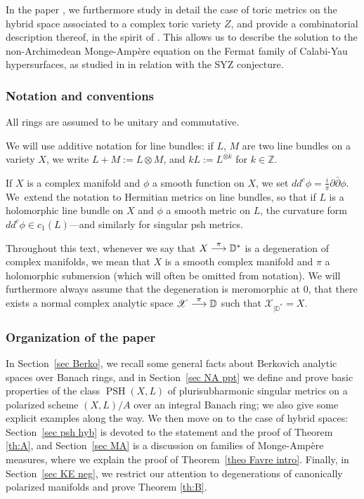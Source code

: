 \documentclass[JEP,XML,SOM,Unicode,published]{cedram}
\newcommand{\To}[1]{\mathchoice{\xrightarrow{\textstyle\kern4pt#1\kern3pt}}{\stackrel{#1}{\longrightarrow}}{}{}}
\theoremstyle{definition}
\newcommand \D {\mathbb{D}}
\newcommand \Z{\mathbb Z}
\newcommand \X {\mathscr{X}}
\DeclareMathOperator{\PSH}{PSH}
\newcommand{\ddbar}{\partial\bar{\partial}}
\begin{document}
In the paper \cite{PS22}, we furthermore study in detail the case of toric metrics on the hybrid space associated to a complex toric variety $Z$, and provide a combinatorial description thereof, in the spirit of \cite{BPS}. This allows us to describe the solution to the non-Archimedean Monge-Ampère equation on the Fermat family of Calabi-Yau hypersurfaces, as studied in \cite{Li1} in relation with the SYZ conjecture.

\subsubsection*{Notation and conventions}
All rings are assumed to be unitary and commutative.

We will use additive notation for line bundles: if $L$, $M$ are two line bundles on a variety $X$, we write $L+M:= L\otimes M$, and $kL:= L^{\otimes k}$ for $k \in \Z$.

If $X$ is a complex manifold and $\phi$ a smooth function on $X$, we set $dd^c \phi = \frac{i}{\pi} \ddbar \phi$. We~extend the notation to Hermitian metrics on line bundles, so that if $L$ is a holomorphic line bundle on $X$ and $\phi$ a smooth metric on $L$, the curvature form $dd^c \phi \in c_1(L)$---and similarly for singular psh metrics.

Throughout this text, whenever we say that $X \To{\pi} \D^*$ is a degeneration of complex manifolds, we mean that $X$ is a smooth complex manifold and $\pi$ a holomorphic submersion (which will often be omitted from notation). We will furthermore always assume that the degeneration is meromorphic at $0$, \ie that there exists a normal complex analytic space $\X \To{\pi} \D$ such that $\X_{| \D^*} = X$.

\subsubsection*{Organization of the paper} In Section~\ref{sec Berko}, we recall some general facts about Berkovich analytic spaces over Banach rings, and in Section~\ref{sec NA ppt} we define and prove basic properties of the class $\PSH(X, L)$ of plurisubharmonic singular metrics on a polarized scheme $(X, L)/A$ over an integral Banach ring; we also give some explicit examples along the way. We then move on to the case of hybrid spaces: Section~\ref{sec psh hyb} is devoted to the statement and the proof of Theorem \ref{th:A}, and Section~\ref{sec MA} is a discussion on families of Monge-Ampère measures, where we explain the proof of Theorem~\ref{theo Favre intro}. Finally, in Section~\ref{sec KE neg}, we restrict our attention to degenerations of canonically polarized manifolds and prove Theorem \ref{th:B}.
\end{document}

